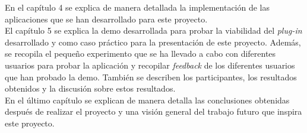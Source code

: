 En el cap\'itulo 4 se explica de manera detallada la implementaci\'on de las aplicaciones que se han desarrollado para este proyecto.\\

El cap\'itulo 5 se explica la demo desarrollada para probar la viabilidad del \textit{plug-in} desarrollado y como caso pr\'actico para la presentaci\'on de este proyecto. Adem\'as, se recopila el peque\~no experimento que se ha llevado a cabo con diferentes usuarios para probar la aplicaci\'on y recopilar \textit{feedback} de los diferentes usuarios que han probado la demo. Tambi\'en se describen los participantes, los resultados obtenidos y la discusi\'on sobre estos resultados.\\

En el \'ultimo cap\'itulo se explican de manera detalla las conclusiones obtenidas despu\'es de realizar el proyecto y una visi\'on general del trabajo futuro que inspira este proyecto.






